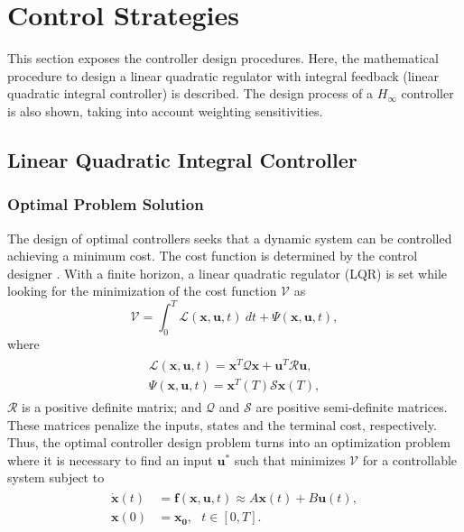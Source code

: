 \section{Control Strategies}
\label{sec:controlstrategies}
This section exposes the controller design procedures. Here, the mathematical procedure to design a linear quadratic regulator with integral feedback (linear quadratic integral controller) is described. The design process of a $H_{\infty}$ controller is also shown, taking into account weighting sensitivities.

\subsection{Linear Quadratic Integral Controller}
\subsubsection{Optimal Problem Solution}
The design of optimal controllers seeks that a dynamic system can be controlled achieving a minimum cost. The cost function is determined by the control designer \cite{Steinbuch2007}. With a finite horizon, a linear quadratic regulator (LQR) is set while looking for the minimization of the cost function $\mathcal{V}$ as
\begin{equation}
\label{eqn:cost}
\mathcal{V} = \int_{0}^{T}\mathcal{L}(\mathbf{x},\mathbf{u},t)\ dt + \Psi(\mathbf{x},\mathbf{u},t),
\end{equation}
where
\begin{align}
\begin{split}
\mathcal{L}(\mathbf{x},\mathbf{u},t) = \mathbf{x}^{T}\mathcal{Q}\mathbf{x} + \mathbf{u}^{T}\mathcal{R}\mathbf{u},\\[5px]
\Psi(\mathbf{x},\mathbf{u},t) = \mathbf{x}^{T}(T)\mathcal{S}\mathbf{x}(T),
\end{split}
\end{align}
$\mathcal{R}$ is a positive definite matrix; and $\mathcal{Q}$ and $\mathcal{S}$ are positive semi-definite matrices. These matrices penalize the inputs, states and the terminal cost, respectively. Thus, the optimal controller design problem turns into an optimization problem where it is necessary to find an input $\mathbf{u}^{*}$ such that minimizes $\mathcal{V}$ for a controllable system subject to
\begin{align}
\begin{split}
\dot{\mathbf{x}}(t) & = \mathbf{f}(\mathbf{x}, \mathbf{u}, t) \approx A\mathbf{x}(t)+B\mathbf{u}(t),\\[5px]
\mathbf{x}(0) & = \mathbf{x_0},\ \ \ t \in [0, T].
\end{split}
\end{align}
